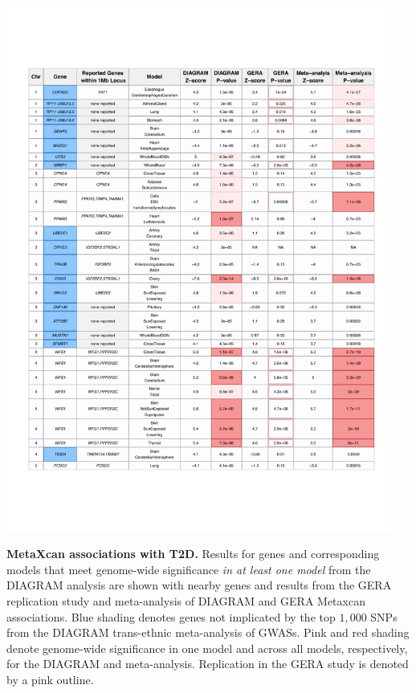 \documentclass[10pt]{article}
\begin{document}
\begin{table}
	\includegraphics[width=0.95\textwidth]{supp_tab1_part1.pdf}
	\caption{\textbf{MetaXcan associations with T2D.} Results for genes and corresponding models that meet genome-wide significance \textit{in at least one model} from the DIAGRAM analysis are shown with nearby genes and results from the GERA replication study and meta-analysis of DIAGRAM and GERA Metaxcan associations. Blue shading denotes genes not implicated by the top $1,000$ SNPs from the DIAGRAM trans-ethnic meta-analysis of GWASs. Pink and red shading denote genome-wide significance in one model and across all models, respectively, for the DIAGRAM and meta-analysis. Replication in the GERA study is denoted by a pink outline.} 
	\label{tab:supp.table1.part1}
\end{table}
\end{document}
